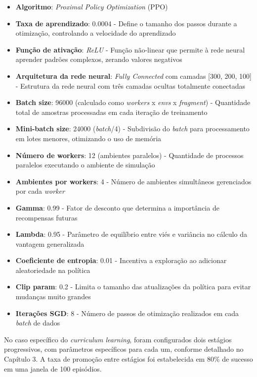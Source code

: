 \begin{itemize}
    \item \textbf{Algoritmo}: \textit{Proximal Policy Optimization} (PPO) 
    \item \textbf{Taxa de aprendizado}: 0.0004 - Define o tamanho dos passos durante a otimização, controlando a velocidade do aprendizado
    \item \textbf{Função de ativação}: \textit{ReLU} - Função não-linear que permite à rede neural aprender padrões complexos, zerando valores negativos
    \item \textbf{Arquitetura da rede neural}: \textit{Fully Connected} com camadas [300, 200, 100] - Estrutura da rede neural com três camadas ocultas totalmente conectadas
    \item \textbf{Batch size}: 96000 (calculado como \textit{workers} x \textit{envs} x \textit{fragment}) - Quantidade total de amostras processadas em cada iteração de treinamento
    \item \textbf{Mini-batch size}: 24000 (\textit{batch}/4) - Subdivisão do \textit{batch} para processamento em lotes menores, otimizando o uso de memória
    \item \textbf{Número de workers}: 12 (ambientes paralelos) - Quantidade de processos paralelos executando o ambiente de simulação
    \item \textbf{Ambientes por workers}: 4 - Número de ambientes simultâneos gerenciados por cada \textit{worker}
    \item \textbf{Gamma}: 0.99 - Fator de desconto que determina a importância de recompensas futuras
    \item \textbf{Lambda}: 0.95 - Parâmetro de equilíbrio entre viés e variância no cálculo da vantagem generalizada
    \item \textbf{Coeficiente de entropia}: 0.01 - Incentiva a exploração ao adicionar aleatoriedade na política
    \item \textbf{Clip param}: 0.2 - Limita o tamanho das atualizações da política para evitar mudanças muito grandes
    \item \textbf{Iterações SGD}: 8 - Número de passos de otimização realizados em cada \textit{batch} de dados
\end{itemize}

No caso específico do \textit{curriculum learning}, foram configurados dois estágios progressivos, com parâmetros específicos para cada um, conforme detalhado no Capítulo 3. A taxa de promoção entre estágios foi estabelecida em 80\% de sucesso em uma janela de 100 episódios.

